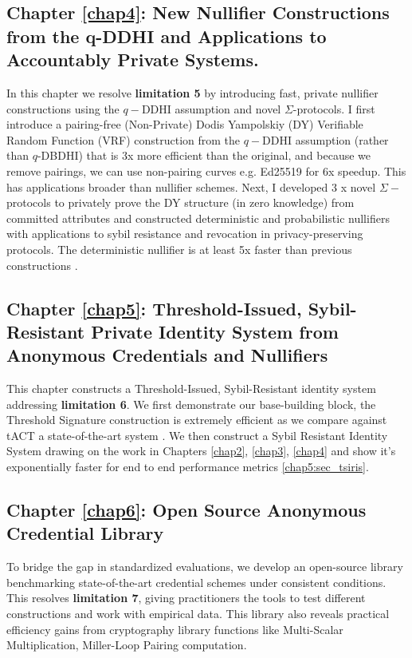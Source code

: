 \subsection{Chapter \ref{chap4}: New Nullifier Constructions from the q-DDHI and Applications to Accountably Private Systems.}
In this chapter we resolve \textbf{limitation 5} by introducing fast, private nullifier constructions using the $q-$DDHI assumption and novel $\Sigma$-protocols. I first introduce a pairing-free (Non-Private) Dodis Yampolskiy (DY) \cite{hutchison_verifiable_2005} Verifiable Random Function (VRF) construction from the $q-$DDHI assumption (rather than $q$-DBDHI) that is 3x more efficient than the original, and because we remove pairings, we can use non-pairing curves e.g. Ed25519 for 6x speedup. This has applications broader than nullifier schemes. Next, I developed 3 x novel $\Sigma-$ protocols to privately prove the DY structure (in zero knowledge) from committed attributes and constructed deterministic and probabilistic nullifiers with applications to sybil resistance and revocation in privacy-preserving protocols. The deterministic nullifier is at least 5x faster than previous constructions \cite{tomescu_utt_2022}.

\subsection{Chapter \ref{chap5}: Threshold-Issued, Sybil-Resistant Private Identity System from Anonymous Credentials and Nullifiers}
This chapter constructs a Threshold-Issued, Sybil-Resistant identity system addressing \textbf{limitation 6}. We first demonstrate our base-building block, the Threshold Signature construction is extremely efficient as we compare against tACT a state-of-the-art system \cite{rabaninejad_attribute-based_2024}. We then construct a Sybil Resistant Identity System drawing on the work in  Chapters \ref{chap2}, \ref{chap3}, \ref{chap4} and show it's exponentially faster for end to end performance metrics \ref{chap5:sec_tsiris}.

\subsection{Chapter \ref{chap6}: Open Source Anonymous Credential Library}
To bridge the gap in standardized evaluations, we develop an open-source library benchmarking state-of-the-art credential schemes under consistent conditions. This resolves \textbf{limitation 7}, giving practitioners the tools to test different constructions and work with empirical data. This library also reveals practical efficiency gains from cryptography library functions like Multi-Scalar Multiplication, Miller-Loop Pairing computation.